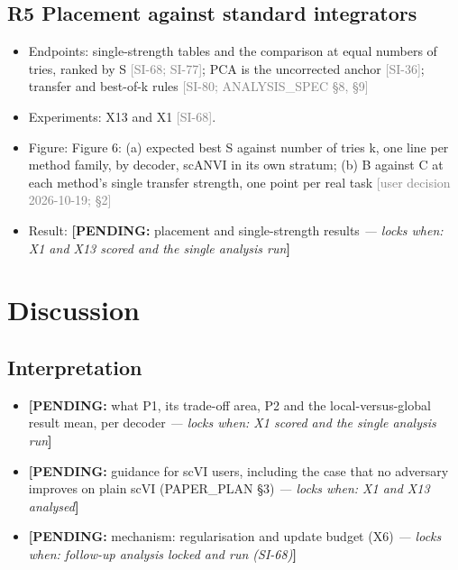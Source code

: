\documentclass[11pt]{article}
\newcommand{\src}[1]{{\scriptsize\textcolor{gray}{[#1]}}}
\newcommand{\pending}[2]{{\color{BurntOrange}\textbf{[PENDING:} #1 \textit{--- locks when: #2}\textbf{]}}}
\begin{document}
\subsection{R5 Placement against standard integrators}
\begin{itemize}
\item Endpoints: single-strength tables and the comparison at equal numbers of tries, ranked by S \src{SI-68; SI-77}; PCA is the uncorrected anchor \src{SI-36}; transfer and best-of-k rules \src{SI-80; ANALYSIS\_SPEC \S8, \S9}
\item Experiments: X13 and X1 \src{SI-68}.
\item Figure: Figure 6: (a) expected best S against number of tries k, one line per method family, by decoder, scANVI in its own stratum; (b) B against C at each method's single transfer strength, one point per real task \src{user decision 2026-10-19;  \S2}
\item Result: \pending{placement and single-strength results}{X1 and X13 scored and the single analysis run}
\end{itemize}

\section{Discussion}
\subsection{Interpretation}
\begin{itemize}
\item \pending{what P1, its trade-off area, P2 and the local-versus-global result mean, per decoder}{X1 scored and the single analysis run}
\item \pending{guidance for scVI users, including the case that no adversary improves on plain scVI (PAPER\_PLAN \S3)}{X1 and X13 analysed}
\item \pending{mechanism: regularisation and update budget (X6)}{follow-up analysis locked and run (SI-68)}
\end{itemize}
\end{document}
